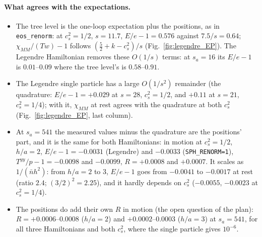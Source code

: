 \documentclass[11pt,aps,preprint,nofootinbib,superscriptaddress,tightenlines]{revtex4-2}
\def\Fig#1{Fig.~\ref{#1}}
\let\oldparagraph\paragraph
\renewcommand{\paragraph}{\par\bigskip\oldparagraph}
\begin{document}
\paragraph{What agrees with the expectations.}
\begin{itemize}
\item The tree level is the one-loop expectation plus the positions, as in \texttt{eos\_renorm}: at $c_s^2=1/2$, $s=11.7$, $E/e-1=0.576$ against
  $7.5/s=0.64$; $\chi_{MM}/(Tw)-1$ follows $(\tfrac52+k-c_s^2)/s$ (\Fig{fig:legendre_EP}).  The Legendre Hamiltonian removes these $O(1/s)$ terms: at
  $s_a=16$ its $E/e-1$ is $0.01$--$0.09$ where the tree level's is $0.58$--$0.91$.
\item The Legendre single particle has a large $O(1/s^2)$ remainder (the quadrature: $E/e-1=+0.029$ at $s=28$, $c_s^2=1/2$, and $+0.11$ at $s=21$,
  $c_s^2=1/4$); with it, $\chi_{MM}$ at rest agrees with the quadrature at both $c_s^2$ (\Fig{fig:legendre_EP}, last column).
\item At $s_a=541$ the measured values minus the quadrature are the positions' part, and it is the same for both Hamiltonians: in motion at $c_s^2=1/2$,
  $h/a=2$, $E/e-1=-0.0031$ (Legendre) and $-0.0033$ (\texttt{SPH\_RENORM=1}), $T^{yy}/p-1=-0.0098$ and $-0.0099$, $R=+0.0008$ and $+0.0007$.  It
  scales as $1/(\bar nh^2)$: from $h/a=2$ to $3$, $E/e-1$ goes from $-0.0041$ to $-0.0017$ at rest (ratio $2.4$; $(3/2)^2=2.25$), and it hardly depends on
  $c_s^2$ ($-0.0055$, $-0.0023$ at $c_s^2=1/4$).
\item The positions do add their own $R$ in motion (the open question of the plan): $R=+0.0006$--$0.0008$ ($h/a=2$) and $+0.0002$--$0.0003$ ($h/a=3$) at
  $s_a=541$, for all three Hamiltonians and both $c_s^2$, where the single particle gives $10^{-6}$.
\end{itemize}
\end{document}
